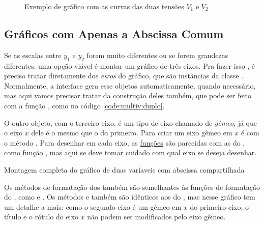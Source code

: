     \begin{figure}[htbp]
        \centering
        

        \caption{Exemplo de gráfico com as curvas das duas tensões $V_1$ e $V_2$}
        \label{fig:multiv:juntos}
    \end{figure}


\subsection{Gráficos com Apenas a Abscissa Comum}

    Se as escalas entre $y_1$ e $y_2$ forem muito diferentes ou se forem grandezas diferentes, uma opção viável é montar um gráfico de três eixos. Pra fazer isso \matplotlib, é preciso tratar diretamente dos \emph{eixos} do gráfico, que são instâncias da classe . Normalmente, a interface \pyplot gera esse objetos automaticamente, quando necessário, mas aqui vamos precisar tratar da construção deles também, que pode ser feito com a função , como no código \ref{code:multiv:duplo}.

    O outro objeto, com o terceiro eixo, é um tipo de eixo chamado de \emph{gêmeo}, já que o eixo $x$ dele é o mesmo que o do primeiro. Para criar um eixo gêmeo em $x$ é com o método . Para desenhar em cada eixo, as \href{https://matplotlib.org/3.1.0/api/axes_api.html\#plotting}{funções} são parecidas com as do \pyplot, como função , mas aqui se deve tomar cuidado com qual eixo se deseja desenhar.

    \begin{listing}[H]
        \caption{Montagem completa do gráfico de duas varíaveis com abscissa compartilhada}
        \label{code:multiv:duplo}

    \end{listing}

    Os métodos de formatação dos  também são semelhantes às funções de formatação do \pyplot, como  e . Os métodos  e  também são idênticos aos do \pyplot, mas nesse gráfico tem um detalhe a mais: como o segundo eixo é um gêmeo em $x$ do primeiro eixo, o título e o rótulo do eixo $x$ não podem ser modificados pelo eixo gêmeo.


